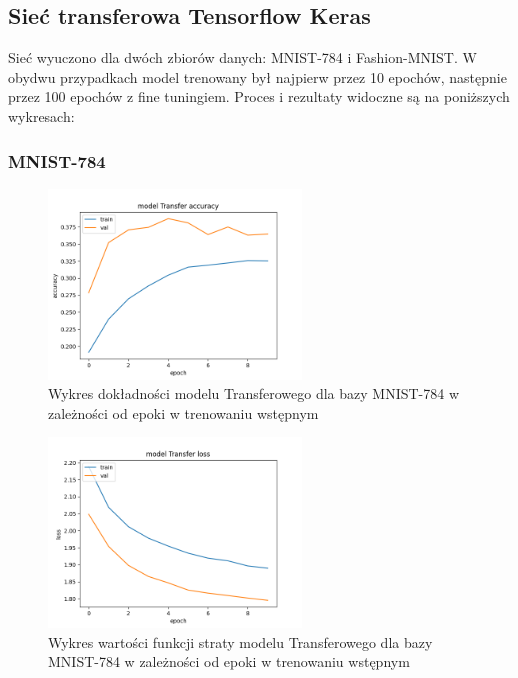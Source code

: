 \documentclass{article}
\begin{document}
\subsection{Sieć transferowa Tensorflow Keras}
Sieć wyuczono dla dwóch zbiorów danych: MNIST-784 i Fashion-MNIST. W obydwu
przypadkach model trenowany był najpierw przez 10 epochów, następnie
przez 100 epochów z fine tuningiem. Proces i rezultaty widoczne są na poniższych wykresach:

\subsubsection{MNIST-784}
\begin{figure}[H]
    \centering
    \includegraphics[width=0.6\textwidth]{../Saves/Transfer/mnist-784/Transfer_mnist_784_ep10_acc.png}
    \caption{Wykres dokładności modelu Transferowego dla bazy MNIST-784 w zależności od epoki w trenowaniu wstępnym}
\end{figure}

\begin{figure}[H]
    \centering
    \includegraphics[width=0.6\textwidth]{../Saves/Transfer/mnist-784/Transfer_mnist_784_ep10_loss.png}
    \caption{Wykres wartości funkcji straty modelu Transferowego dla bazy MNIST-784 w zależności od epoki w trenowaniu wstępnym} 
\end{figure}
\end{document}
